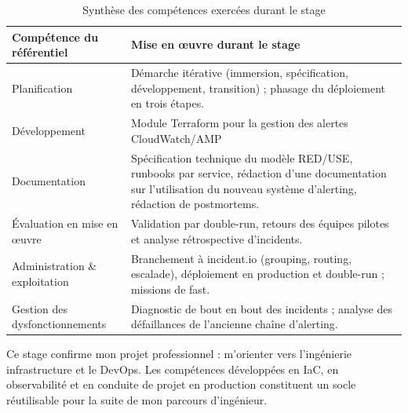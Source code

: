 \begin{table}[h]
	\centering
	\caption{Synthèse des compétences exercées durant le stage}
	\label{tab:synthese-competences}
	\begin{tabular}{|p{}|p{}|}
		\hline
		\textbf{Compétence du référentiel} & \textbf{Mise en œuvre durant le stage} \\
		\hline
		Planification & Démarche itérative (immersion, spécification, développement, transition) ; phasage du déploiement en trois étapes. \\
		\hline
		Développement & Module Terraform pour la gestion des alertes CloudWatch/AMP \\
		\hline
		Documentation & Spécification technique du modèle RED/USE, runbooks par service, rédaction d'une documentation sur l'utilisation du nouveau système d'alerting, rédaction de postmortems. \\
		\hline
		Évaluation en mise en œuvre & Validation par double-run, retours des équipes pilotes et analyse rétrospective d'incidents. \\
		\hline
		Administration \& exploitation & Branchement à incident.io (grouping, routing, escalade), déploiement en production et double-run ; missions de fast. \\
		\hline
		Gestion des dysfonctionnements & Diagnostic de bout en bout des incidents ; analyse des défaillances de l'ancienne chaîne d'alerting. \\
		\hline
	\end{tabular}
\end{table}

Ce stage confirme mon projet professionnel : m'orienter vers l'ingénierie infrastructure et le DevOps.
Les compétences développées en IaC, en observabilité et en conduite de projet en production
constituent un socle réutilisable pour la suite de mon parcours d'ingénieur.
